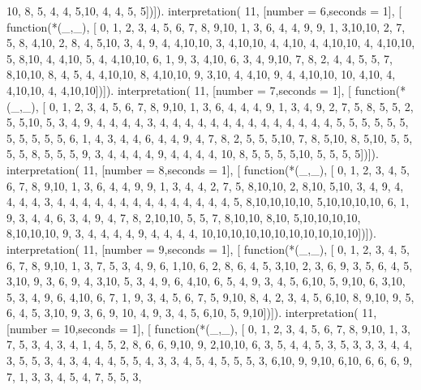         10, 8, 5, 4, 4, 5,10, 4, 4, 5, 5])]).
interpretation( 11, [number = 6,seconds = 1], [
    function(*(_,_), [
         0, 1, 2, 3, 4, 5, 6, 7, 8, 9,10,
         1, 3, 6, 4, 4, 9, 9, 1, 3,10,10,
         2, 7, 5, 8, 4,10, 2, 8, 4, 5,10,
         3, 4, 9, 4, 4,10,10, 3, 4,10,10,
         4, 4,10, 4, 4,10,10, 4, 4,10,10,
         5, 8,10, 4, 4,10, 5, 4, 4,10,10,
         6, 1, 9, 3, 4,10, 6, 3, 4, 9,10,
         7, 8, 2, 4, 4, 5, 5, 7, 8,10,10,
         8, 4, 5, 4, 4,10,10, 8, 4,10,10,
         9, 3,10, 4, 4,10, 9, 4, 4,10,10,
        10, 4,10, 4, 4,10,10, 4, 4,10,10])]).
interpretation( 11, [number = 7,seconds = 1], [
    function(*(_,_), [
         0, 1, 2, 3, 4, 5, 6, 7, 8, 9,10,
         1, 3, 6, 4, 4, 4, 9, 1, 3, 4, 9,
         2, 7, 5, 8, 5, 5, 2, 5, 5,10, 5,
         3, 4, 9, 4, 4, 4, 4, 3, 4, 4, 4,
         4, 4, 4, 4, 4, 4, 4, 4, 4, 4, 4,
         5, 5, 5, 5, 5, 5, 5, 5, 5, 5, 5,
         6, 1, 4, 3, 4, 4, 6, 4, 4, 9, 4,
         7, 8, 2, 5, 5, 5,10, 7, 8, 5,10,
         8, 5,10, 5, 5, 5, 5, 8, 5, 5, 5,
         9, 3, 4, 4, 4, 4, 9, 4, 4, 4, 4,
        10, 8, 5, 5, 5, 5,10, 5, 5, 5, 5])]).
interpretation( 11, [number = 8,seconds = 1], [
    function(*(_,_), [
         0, 1, 2, 3, 4, 5, 6, 7, 8, 9,10,
         1, 3, 6, 4, 4, 9, 9, 1, 3, 4, 4,
         2, 7, 5, 8,10,10, 2, 8,10, 5,10,
         3, 4, 9, 4, 4, 4, 4, 3, 4, 4, 4,
         4, 4, 4, 4, 4, 4, 4, 4, 4, 4, 4,
         5, 8,10,10,10,10, 5,10,10,10,10,
         6, 1, 9, 3, 4, 4, 6, 3, 4, 9, 4,
         7, 8, 2,10,10, 5, 5, 7, 8,10,10,
         8,10, 5,10,10,10,10, 8,10,10,10,
         9, 3, 4, 4, 4, 4, 9, 4, 4, 4, 4,
        10,10,10,10,10,10,10,10,10,10,10])]).
interpretation( 11, [number = 9,seconds = 1], [
    function(*(_,_), [
         0, 1, 2, 3, 4, 5, 6, 7, 8, 9,10,
         1, 3, 7, 5, 3, 4, 9, 6, 1,10, 6,
         2, 8, 6, 4, 5, 3,10, 2, 3, 6, 9,
         3, 5, 6, 4, 5, 3,10, 9, 3, 6, 9,
         4, 3,10, 5, 3, 4, 9, 6, 4,10, 6,
         5, 4, 9, 3, 4, 5, 6,10, 5, 9,10,
         6, 3,10, 5, 3, 4, 9, 6, 4,10, 6,
         7, 1, 9, 3, 4, 5, 6, 7, 5, 9,10,
         8, 4, 2, 3, 4, 5, 6,10, 8, 9,10,
         9, 5, 6, 4, 5, 3,10, 9, 3, 6, 9,
        10, 4, 9, 3, 4, 5, 6,10, 5, 9,10])]).
interpretation( 11, [number = 10,seconds = 1], [
    function(*(_,_), [
         0, 1, 2, 3, 4, 5, 6, 7, 8, 9,10,
         1, 3, 7, 5, 3, 4, 3, 4, 1, 4, 5,
         2, 8, 6, 6, 9,10, 9, 2,10,10, 6,
         3, 5, 4, 4, 5, 3, 5, 3, 3, 3, 4,
         4, 3, 5, 5, 3, 4, 3, 4, 4, 4, 5,
         5, 4, 3, 3, 4, 5, 4, 5, 5, 5, 3,
         6,10, 9, 9,10, 6,10, 6, 6, 6, 9,
         7, 1, 3, 3, 4, 5, 4, 7, 5, 5, 3,
